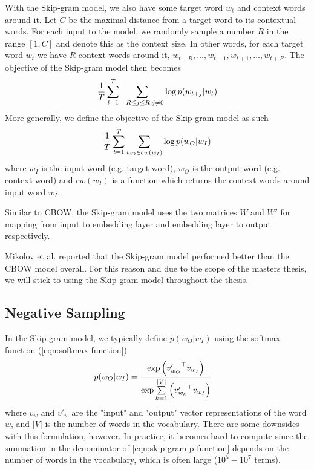 With the Skip-gram model, we also have some target word $w_t$ and context words around it. Let $C$ be the maximal distance from a target word to its contextual words. For each input to the model, we randomly sample a number $R$ in the range $[1, C]$ and denote this as the context size. In other words, for each target word $w_t$ we have $R$ context words around it, $w_{t-R}, \ldots, w_{t-1}, w_{t+1}, \ldots, w_{t+R}$. The objective of the Skip-gram model then becomes
\begin{align}
    \frac{1}{T} \sum\limits_{t=1}^{T} \sum\limits_{-R \leq j \leq R, j \neq 0}^{} \log p(w_{t+j} | w_t)
    \label{eqn:skip-gram-objective-function}
\end{align}
More generally, we define the objective of the Skip-gram model as such
\begin{align}
    \frac{1}{T} \sum\limits_{t=1}^{T} \sum\limits_{w_O \in cw(w_I)}^{} \log p(w_O | w_I)
    \label{eqn:skip-gram-objective-function-general}
\end{align}
where $w_I$ is the input word (e.g. target word), $w_O$ is the output word (e.g. context word) and $cw(w_I)$ is a function which returns the context words around input word $w_I$.

Similar to CBOW, the Skip-gram model uses the two matrices $W$ and $W'$ for mapping from input to embedding layer and embedding layer to output respectively.

Mikolov et al. reported that the Skip-gram model performed better than the CBOW model overall. For this reason and due to the scope of the masters thesis, we will stick to using the Skip-gram model throughout the thesis.

\subsection{Negative Sampling}
In the Skip-gram model, we typically define $p(w_O | w_I)$ using the softmax function (\cref{eqn:softmax-function})
\begin{align}
    p(w_O | w_I)
    &= \frac{\exp{ \left( {v'_{w_O}}^\top v_{w_I} \right) }} {\exp{ \sum\limits_{k=1}^{|V|} \left( {v'_{w_k}}^\top v_{w_I} \right) }}
    \label{eqn:skip-gram-p-function}
\end{align}
where $v_w$ and $v'_w$ are the "input" and "output" vector representations of the word $w$, and $|V|$ is the number of words in the vocabulary. There are some downsides with this formulation, however. In practice, it becomes hard to compute since the summation in the denominator of \cref{eqn:skip-gram-p-function} depends on the number of words in the vocabulary, which is often large ($10^5 - 10^7$ terms).

